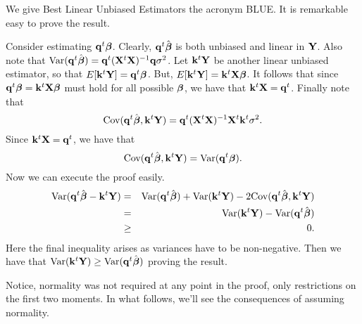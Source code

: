 We give Best Linear Unbiased Estimators the acronym
BLUE. It is remarkable easy to prove the result. 

Consider estimating $\bq^t \bbeta$.
Clearly, $\bq^t \hat \bbeta$ is both unbiased and linear in $\bY$. 
Also note that $\Var(\bq^t \hat \bbeta) = \bq^t \xtxinv \bq \sigma^2$. 
Let $\bk^t \bY$ be another linear unbiased estimator, so that
$E[\bk^t \bY] = \bq^t \bbeta$. But, $E[\bk^t \bY] = \bk^t \bX \bbeta$. 
It follows that since  $\bq^t \bbeta = \bk^t \bX \bbeta$ must hold for all possible $\bbeta$, we have that
$\bk^t \bX = \bq^t$. Finally note that
$$
\Cov(\bq^t \hat \bbeta, \bk^t \bY)
= \bq^t \xtxinv \bX^t \bk^t \sigma^2.
$$
Since $\bk^t \bX = \bq^t$, we have that
$$
\Cov(\bq^t \hat \bbeta, \bk^t \bY) = \Var(\bq^t \bbeta).
$$
Now we can execute the proof easily. 
\begin{eqnarray*}
\Var(\bq^t \hat \bbeta - \bk^t \bY) & = & 
\Var(\bq^t \hat \bbeta) + \Var(\bk^t \bY) - 2 \Cov(\bq^t \hat \bbeta, \bk^t \bY) \\
& = & \Var(\bk^t \bY) - \Var(\bq^t \hat \bbeta) \\ 
& \geq & 0.
\end{eqnarray*}
Here the final inequality arises as variances have to be non-negative. Then we have
that $\Var(\bk^t \bY) \geq \Var(\bq^t \hat \bbeta)$ proving the result.

Notice, normality was not required at any point in the proof, only restrictions
on the first two moments. In what follows, we'll see the consequences of
assuming normality.


